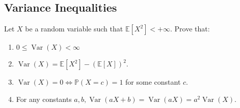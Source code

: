 \begin{center}
  \section*{Variance Inequalities}
\end{center}

\begin{Exercise}
  Let $X$ be a random variable such that $\mathbb{E}\left[X^2\right]<+\infty$. Prove that:
  \begin{enumerate}
    \item $0 \leq \operatorname{Var}(X)<\infty$
    \item $\operatorname{Var}(X)=\mathbb{E}\left[X^2\right]-{(\mathbb{E}[X])}^2$.
    \item $\operatorname{Var}(X)=0 \Longleftrightarrow \mathbb{P}(X=c)=1$ for some constant $c$.
    \item For any constants $a, b, \operatorname{Var}(a X+b)=\operatorname{Var}(a X)=a^2
            \operatorname{Var}(X)$.
  \end{enumerate}
\end{Exercise}

